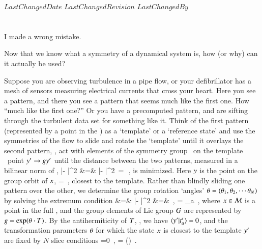 
{$LastChangedDate$}
{$LastChangedRevision$} {$LastChangedBy$}


\section{\Reducedsp}
\label{sect:reducedStateSp}

\begin{bartlett}
I made a wrong mistake.
\end{bartlett}

\noindent
Now that we know what a symmetry of a dynamical system is, how
(or why) can it actually be used?

Suppose you are observing turbulence in a pipe flow, or your
defibrillator has a mesh of sensors measuring electrical currents that
cross your heart. Here you see a pattern, and there you see a pattern
that seems much like the first one. How ``much like the first one?'' Or
you have a precomputed pattern, and are sifting through the turbulent
data set for something like it. Think of the first pattern (represented
by a point {\slicep} in the \statesp) as a
`template' or a
`reference state' and use the symmetries of the flow to slide and rotate
the `template' until it overlays the second pattern, \ie, act with elements of
the symmetry group \Group\ on the template \statesp\ point ${{y'}} \to
{\ensuremath{g}}{{\ensuremath{y'}}}$ until the distance between the two patterns, measured
in a bilinear norm of ,
\bea
|\ssp - {\LieEl}{\slicep}|^2
    &=& |\sspRed - \slicep|^2
		\,=\,
   \braket{\sspRed - \slicep}{\sspRed - \slicep}
\,,
    \label{minDistance}
\eea
is minimized. Here $y$ is the point on the group orbit
of $x$,
\beq
\ssp=\LieEl \sspRed
\,,
closest to the template. Rather than blindly sliding one pattern over the
other, we determine the group rotation `angles' $\gSpace =
(\gSpace_1,\gSpace_2,\cdots\gSpace_N)$ by solving the extremum condition
 &=&
 |\ssp - \LieEl\slicep|^2
	\continue
  &=& 
    \,,\qquad
	   = \Lg_a \slicep
\,,
\label{PCsectQ}
\eea
where $x \in {\cal M}$ is a point in the full \statesp, and  the group
elements  of Lie group $G$ are represented  by
$g=\exp({\bf \theta} \cdot T)$.
By the antihermiticity of $T$, ,  we have
$\braket{\slicep}{\sliceTan{a}}=0$, and the transformation parameters
${\bf \theta}$ for which the state $x$ is closest to the template
${y'}$ are fixed by $N$ slice conditions
\beq
{} =0
    \,,\qquad
\sspRed = \LieEl(\gSpace) \ssp
\,.

